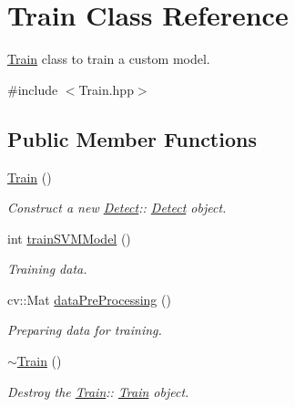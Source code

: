 \hypertarget{classTrain}{}\section{Train Class Reference}
\label{classTrain}


\hyperlink{classTrain}{Train} class to train a custom model.  




{\ttfamily \#include $<$Train.\+hpp$>$}

\subsection*{Public Member Functions}
\begin{DoxyCompactItemize}
\item 
\mbox{\label{classTrain_aa05ce5a8ff68dea76d457f4ff2d0d1ba}} 
\hyperlink{classTrain_aa05ce5a8ff68dea76d457f4ff2d0d1ba}{Train} ()
\begin{DoxyCompactList}\small\item\em Construct a new \hyperlink{classDetect}{Detect}\+:\+: \hyperlink{classDetect}{Detect} object. \end{DoxyCompactList}\item 
\mbox{\label{classTrain_aaaa3e3a0ff509798fc93704a0dbdc435}} 
int \hyperlink{classTrain_aaaa3e3a0ff509798fc93704a0dbdc435}{train\+S\+V\+M\+Model} ()
\begin{DoxyCompactList}\small\item\em Training data. \end{DoxyCompactList}\item 
\mbox{\label{classTrain_a8fc02c90413a86574d4afd6268da2a5d}} 
cv\+::\+Mat \hyperlink{classTrain_a8fc02c90413a86574d4afd6268da2a5d}{data\+Pre\+Processing} ()
\begin{DoxyCompactList}\small\item\em Preparing data for training. \end{DoxyCompactList}\item 
\mbox{\label{classTrain_a28c78c0d21e7fbce79cb94927f23c11e}} 
\hyperlink{classTrain_a28c78c0d21e7fbce79cb94927f23c11e}{$\sim$\+Train} ()
\begin{DoxyCompactList}\small\item\em Destroy the \hyperlink{classTrain}{Train}\+:\+: \hyperlink{classTrain}{Train} object. \end{DoxyCompactList}\end{DoxyCompactItemize}


